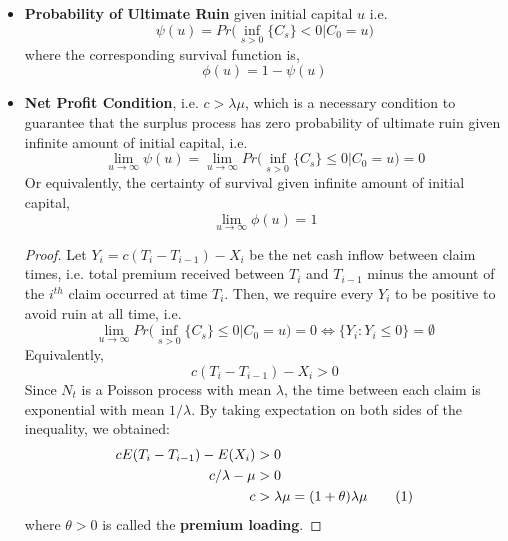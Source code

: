 \documentclass[12pt]{article}
\newcommand\numberthis{\addtocounter{equation}{1}\tag{\theequation}}
\begin{document}
\begin{itemize}
  \item \textbf{Probability of Ultimate Ruin} given initial capital \(u\) i.e.
    \begin{equation}\label{Pr-Ul-ruin}
        \psi(u) = Pr\Big(\inf_{s>0}\{C_s\}<0|C_0=u\Big)
    \end{equation}
    where the corresponding survival function is,
    \begin{equation}\label{survival-f}
        \phi(u) = 1-\psi(u)
    \end{equation}
  \item \textbf{Net Profit Condition}, i.e. \(c>\lambda\mu\), which is a necessary condition to guarantee that the surplus process has zero 
  probability of ultimate ruin given infinite amount of initial capital, i.e.
    \begin{equation}\label{net-profit1}
        \lim_{u\to\infty}\psi(u)=\lim_{u\to\infty}Pr\Big(\inf_{s>0}\{C_s\}\leq0|C_0=u\Big)=0
    \end{equation}
    Or equivalently, the certainty of survival given infinite amount of initial capital,
    \begin{equation}\label{net-profit}
        \lim_{u\to\infty}\phi(u)=1
    \end{equation}
    \begin{proof} 
    Let \(Y_i=c(T_{i}-T_{i-1})-X_i\) be the net cash inflow between claim times, i.e. total premium received between \(T_i\) and \(T_{i-1}\) minus the amount of the \(i^{th}\) claim occurred at time \(T_{i}\). Then, we require every \(Y_i\) to be positive to avoid ruin at all time, i.e.
    \[\lim_{u\to\infty}Pr\Big(\inf_{s>0}\{C_s\}\leq0|C_0=u\Big)=0 \Longleftrightarrow \{Y_i:Y_i\leq0\}=\emptyset\]
    Equivalently,
    \[c(T_{i}-T_{i-1})-X_i>0\]
    Since \(N_t\) is a Poisson process with mean \(\lambda\), the time between each claim is exponential with mean \(1/\lambda\). By taking expectation on both sides of the inequality, we obtained:
    \begin{align*}
    {cE(T_{i}-T_{i-1})-E(X_i)}&>{0}\\
    {c/\lambda-\mu}&>{0}\\
    {c}&>{\lambda\mu}={(1+\theta)\lambda\mu}\numberthis
    \end{align*}
    where \(\theta>0\) is called the \textbf{premium loading}.
    \end{proof}
\end{itemize}

\end{document}
